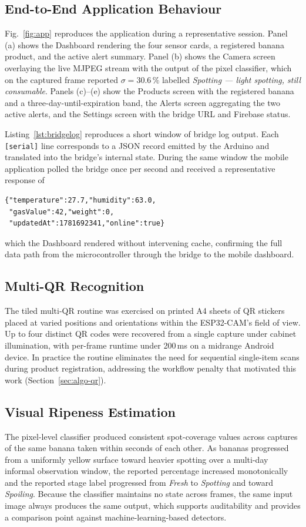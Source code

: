 \subsection{End-to-End Application Behaviour}

Fig.~\ref{fig:app} reproduces the application during a representative
session. Panel (a) shows the Dashboard rendering the four sensor
cards, a registered banana product, and the active alert summary.
Panel (b) shows the Camera screen overlaying the live MJPEG stream
with the output of the pixel classifier, which on the captured frame
reported $\sigma = 30.6\,\%$ labelled \emph{Spotting --- light
spotting, still consumable}. Panels (c)--(e) show the Products screen
with the registered banana and a three-day-until-expiration band, the
Alerts screen aggregating the two active alerts, and the Settings
screen with the bridge URL and Firebase status.

Listing~\ref{lst:bridgelog} reproduces a short window of bridge log
output. Each \texttt{[serial]} line corresponds to a JSON record
emitted by the Arduino and translated into the bridge's internal
state. During the same window the mobile application polled the
bridge once per second and received a representative response of
\begin{lstlisting}
{"temperature":27.7,"humidity":63.0,
 "gasValue":42,"weight":0,
 "updatedAt":1781692341,"online":true}
\end{lstlisting}
which the Dashboard rendered without intervening cache, confirming
the full data path from the microcontroller through the bridge to
the mobile dashboard.

\subsection{Multi-QR Recognition}

The tiled multi-QR routine was exercised on printed A4 sheets of QR
stickers placed at varied positions and orientations within the
ESP32-CAM's field of view. Up to four distinct QR codes were
recovered from a single capture under cabinet illumination, with
per-frame runtime under 200\,ms on a midrange Android device. In
practice the routine eliminates the need for sequential single-item
scans during product registration, addressing the workflow
penalty that motivated this work (Section~\ref{sec:algo-qr}).

\subsection{Visual Ripeness Estimation}

The pixel-level classifier produced consistent spot-coverage values
across captures of the same banana taken within seconds of each
other. As bananas progressed from a uniformly yellow surface toward
heavier spotting over a multi-day informal observation window, the
reported percentage increased monotonically and the reported stage
label progressed from \emph{Fresh} to \emph{Spotting} and toward
\emph{Spoiling}. Because the classifier maintains no state across
frames, the same input image always produces the same output, which
supports auditability and provides a comparison point against
machine-learning-based detectors.
